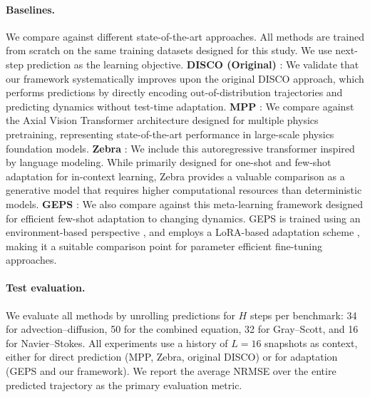 \documentclass{article}
\theoremstyle{plain}
\theoremstyle{definition}
\theoremstyle{remark}
\begin{document}
\paragraph{Baselines.}
We compare against different state-of-the-art approaches. All methods are trained from scratch on the same training datasets designed for this study. We use next-step prediction as the learning objective. \textbf{DISCO (Original)} \citep{morel2025disco}: We validate that our framework systematically improves upon the original DISCO approach, which performs predictions by directly encoding out-of-distribution trajectories and predicting dynamics without test-time adaptation. \textbf{MPP} \citep{mccabe2023multiple}: We compare against the Axial Vision Transformer \citep{ho2019axial} architecture designed for multiple physics pretraining, representing state-of-the-art performance in large-scale physics foundation models. \textbf{Zebra} \citep{serrano2025zebra}: We include this autoregressive transformer inspired by language modeling. While primarily designed for one-shot and few-shot adaptation for in-context learning, Zebra provides a valuable comparison as a generative model that requires higher computational resources than deterministic models. \textbf{GEPS} \citep{koupai2024geps}: We also compare against this meta-learning framework designed for efficient few-shot adaptation to changing dynamics. GEPS is trained using an environment-based perspective \citep{yin2022leads, kirchmeyer2022generalizing}, and employs a LoRA-based adaptation scheme \citep{hu2021lora}, making it a suitable comparison point for parameter efficient fine-tuning approaches.

\paragraph{Test evaluation.}
We evaluate all methods by unrolling predictions for $H$ steps per benchmark: 34 for advection–diffusion, 50 for the combined equation, 32 for Gray--Scott, and 16 for Navier--Stokes. All experiments use a history of $L=16$ snapshots as context, either for direct prediction (MPP, Zebra, original DISCO) or for adaptation (GEPS and our framework). We report the average NRMSE over the entire predicted trajectory as the primary evaluation metric.
\end{document}
